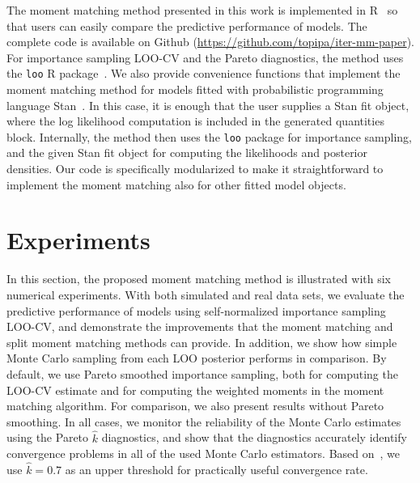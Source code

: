 \documentclass[12pt]{article}
\begin{document}
The moment matching method presented in this work is implemented in R~\citep{rlang}
so that users can easily compare the predictive performance
of models.
The complete code
is available on Github (\url{https://github.com/topipa/iter-mm-paper}).
For importance sampling LOO-CV and the Pareto diagnostics, the method uses
the \texttt{loo} R package~\citep{loo}.
We also provide convenience functions that implement the moment matching method 
for models fitted with probabilistic programming language 
Stan~\citep{carpenter2017stan}. In this case, it is enough that
the user supplies a Stan fit object, where the log likelihood
computation is included in the generated quantities block.
Internally, the method then uses the \texttt{loo} package for importance sampling,
and the given Stan fit object for computing the likelihoods
and posterior densities. Our code is specifically modularized to make it 
straightforward to implement the moment matching also 
for other fitted model objects.








\section{Experiments}





In this section,
the proposed moment matching method is illustrated with six
numerical experiments.
With both simulated and real data sets, we evaluate
the predictive performance of models using self-normalized importance sampling LOO-CV, and demonstrate
the improvements that the moment matching and split moment matching methods can provide.
In addition, we show how simple Monte Carlo sampling from
each LOO posterior performs in comparison.
By default, we use Pareto smoothed importance sampling, both for computing
the LOO-CV estimate and for computing the weighted moments in the moment matching algorithm.
For comparison, we also present results without Pareto smoothing.
In all cases, we monitor the reliability of the Monte Carlo estimates
using the Pareto $\hat{k}$ diagnostics, and show that the
diagnostics accurately identify convergence problems
in all of the used Monte Carlo estimators.
Based on~\citet{vehtari2017practical}, we use $\hat{k} = 0.7$ as
an upper threshold for practically useful convergence rate.
\end{document}
